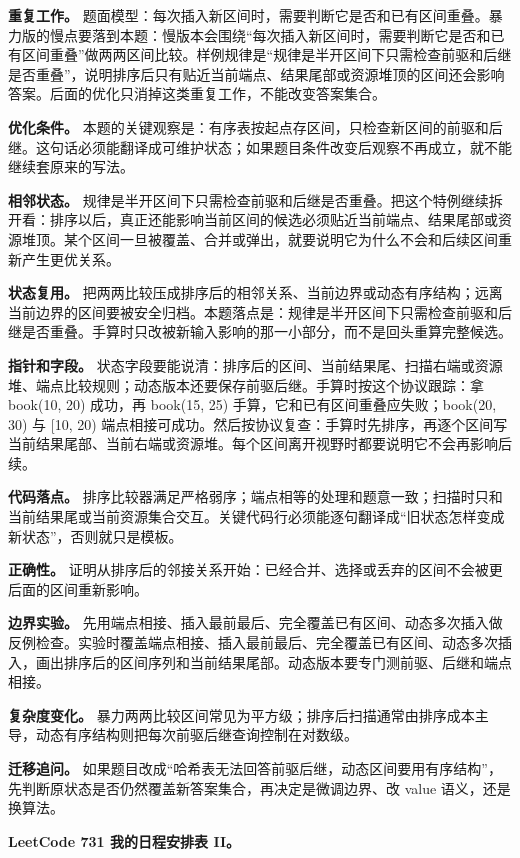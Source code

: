 \textbf{重复工作。} 题面模型：每次插入新区间时，需要判断它是否和已有区间重叠。暴力版的慢点要落到本题：慢版本会围绕“每次插入新区间时，需要判断它是否和已有区间重叠”做两两区间比较。样例规律是“规律是半开区间下只需检查前驱和后继是否重叠”，说明排序后只有贴近当前端点、结果尾部或资源堆顶的区间还会影响答案。后面的优化只消掉这类重复工作，不能改变答案集合。

\textbf{优化条件。} 本题的关键观察是：有序表按起点存区间，只检查新区间的前驱和后继。这句话必须能翻译成可维护状态；如果题目条件改变后观察不再成立，就不能继续套原来的写法。

\textbf{相邻状态。} 规律是半开区间下只需检查前驱和后继是否重叠。把这个特例继续拆开看：排序以后，真正还能影响当前区间的候选必须贴近当前端点、结果尾部或资源堆顶。某个区间一旦被覆盖、合并或弹出，就要说明它为什么不会和后续区间重新产生更优关系。

\textbf{状态复用。} 把两两比较压成排序后的相邻关系、当前边界或动态有序结构；远离当前边界的区间要被安全归档。本题落点是：规律是半开区间下只需检查前驱和后继是否重叠。手算时只改被新输入影响的那一小部分，而不是回头重算完整候选。

\textbf{指针和字段。} 状态字段要能说清：排序后的区间、当前结果尾、扫描右端或资源堆、端点比较规则；动态版本还要保存前驱后继。手算时按这个协议跟踪：拿 book(10, 20) 成功，再 book(15, 25) 手算，它和已有区间重叠应失败；book(20, 30) 与 [10, 20) 端点相接可成功。然后按协议复查：手算时先排序，再逐个区间写当前结果尾部、当前右端或资源堆。每个区间离开视野时都要说明它不会再影响后续。

\textbf{代码落点。} 排序比较器满足严格弱序；端点相等的处理和题意一致；扫描时只和当前结果尾或当前资源集合交互。关键代码行必须能逐句翻译成“旧状态怎样变成新状态”，否则就只是模板。

\textbf{正确性。} 证明从排序后的邻接关系开始：已经合并、选择或丢弃的区间不会被更后面的区间重新影响。

\textbf{边界实验。} 先用端点相接、插入最前最后、完全覆盖已有区间、动态多次插入做反例检查。实验时覆盖端点相接、插入最前最后、完全覆盖已有区间、动态多次插入，画出排序后的区间序列和当前结果尾部。动态版本要专门测前驱、后继和端点相接。

\textbf{复杂度变化。} 暴力两两比较区间常见为平方级；排序后扫描通常由排序成本主导，动态有序结构则把每次前驱后继查询控制在对数级。

\textbf{迁移追问。} 如果题目改成“哈希表无法回答前驱后继，动态区间要用有序结构”，先判断原状态是否仍然覆盖新答案集合，再决定是微调边界、改 value 语义，还是换算法。

\noindent\textbf{LeetCode 731 我的日程安排表 II。}

